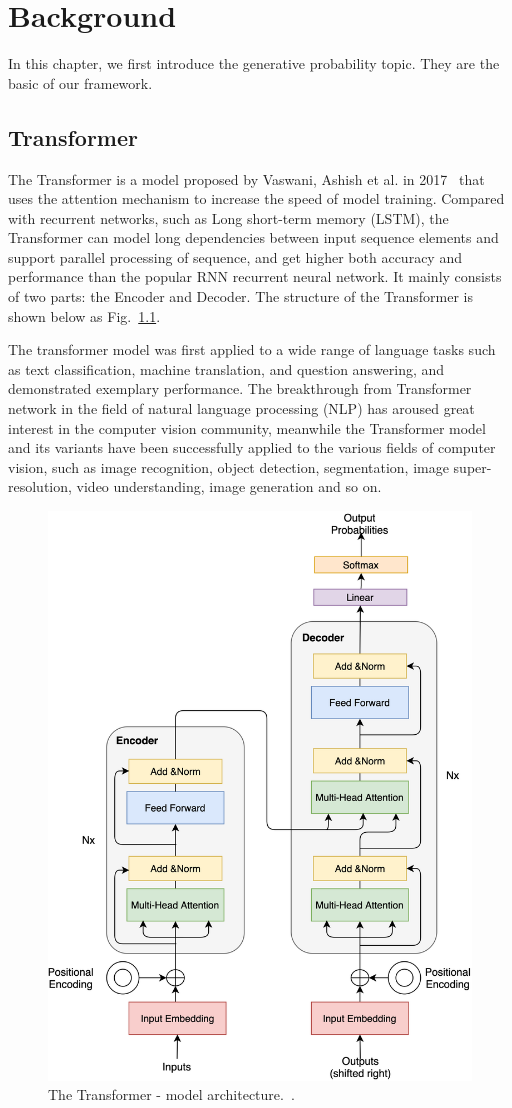 \chapter{Background}
\label{chap:bg}
In this chapter, we first introduce the generative probability topic.
They are the basic of our framework.

\section{Transformer}
\label{section:transformer}
The Transformer is a model proposed by Vaswani, Ashish et al. in 2017~\cite{vaswani2017attention}  that uses the attention mechanism to increase the speed of model training. Compared with recurrent networks, such as Long short-term memory (LSTM), the Transformer can model long dependencies between input sequence elements and support parallel processing of sequence, and get higher both accuracy and performance than the popular RNN recurrent neural network. It mainly consists of two parts: the Encoder and Decoder. The structure of the Transformer is shown below as Fig.~\ref{fig:transformer}.

The transformer model  was first applied to a wide range of language tasks such as text classification, machine translation, and question answering, and demonstrated exemplary performance. The breakthrough from Transformer network in the field of natural language processing (NLP) has aroused great interest in the computer vision community, meanwhile the Transformer model and its variants have been successfully applied to the various fields of computer vision, such as image recognition, object detection, segmentation, image super-resolution, video understanding, image generation and so on. 

\begin{figure}[!htbp]
	\centering
	\includegraphics[width = 0.5 \textwidth]{figures/transformer.png}
	\caption[The Transformer - model architecture]
	{ The Transformer - model architecture.~\cite{vaswani2017attention}.}
	\label{fig:transformer}
\end{figure}

